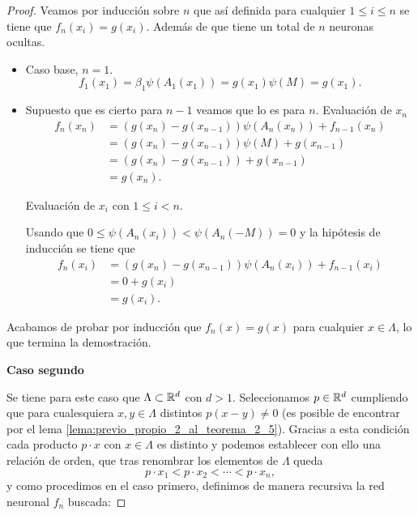 \begin{proof}
Veamos por inducción sobre $n$ que así definida para cualquier $1 \leq i \leq n$ se tiene que     
$f_n(x_i) = g(x_i)$. 
Además de que tiene un total de $n$ neuronas ocultas. 


\begin{itemize}
    \item Caso base, $n=1$. 
    \begin{equation}
        f_1(x_1)= \beta_1 \psi(A_1(x_1)) = g(x_1)\psi(M) = g(x_1).
    \end{equation}
    \item Supuesto que es cierto para $n-1$ veamos que lo es para $n$.      
    Evaluación de $x_n$
    \begin{align}
        f_n(x_n) 
        &= 
        (g(x_n) - g(x_{n-1}))\psi(A_n(x_n)) + f_{n-1}(x_n)
        \\
        & = (g(x_n) - g(x_{n-1}))\psi(M) + g(x_{n-1}) 
        \\
        & = (g(x_n) - g(x_{n-1})) + g(x_{n-1}) 
        \\
        & = g(x_n).
    \end{align}

Evaluación de $x_i$ con $1 \leq i < n$. 

Usando que $0 \leq \psi(A_n(x_i)) < \psi(A_n(-M)) = 0$ y la hipótesis de inducción se tiene que 
\begin{align}
    f_n(x_i) 
        &= 
        (g(x_n) - g(x_{n-1}))\psi(A_n(x_i)) + f_{n-1}(x_i)
        \\
        & = 0 + g(x_{i}) 
        \\
        &= g(x_i).
\end{align}
\end{itemize}

Acabamos de probar por inducción  que
$f_n(x) = g(x)$ para cualquier $x \in \Lambda$, lo que termina la demostración.

\textbf{Caso segundo}  

Se tiene para este caso que $\Lambda \subset \mathbb{R}^d$ con $d >1$. 
Seleccionamos $p \in \mathbb{R}^d$ cumpliendo que 
para cualesquiera $x,y \in \Lambda$ distintos 
$p(x-y) \neq 0$ (es posible de 
encontrar por el lema \ref{lema:previo_propio_2_al_teorema_2_5}).
Gracias a esta condición cada producto $p \cdot x$ con $x \in \Lambda$ es distinto y podemos establecer con ello una relación de orden, que tras 
renombrar los elementos de $\Lambda$ queda
\begin{equation}
    p \cdot x_1 < p \cdot x_2 < \cdots < p \cdot x_n,
\end{equation}
y como procedimos en el caso primero, definimos de manera
 recursiva la red neuronal $f_n$ buscada:


\end{proof}
